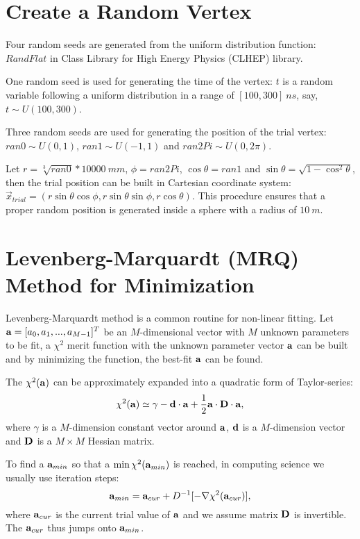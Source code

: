 \section{Create a Random Vertex}

Four random seeds are generated from the uniform distribution function: $RandFlat$ in Class Library for High Energy Physics (CLHEP) library.

One random seed is used for generating the time of the vertex: $t$ is a random variable following a uniform distribution in a range of $[100, 300]~ns$, say, $t\sim U(100,300)$.

Three random seeds are used for generating the position of the trial vertex: $ran0\sim U(0,1)$, $ran1\sim U(-1,1)$ and $ran2Pi\sim U(0,2\pi)$. 

Let $r=\sqrt[3]{ran0}*10000~mm$, $\phi=ran2Pi$, $\cos\theta=ran1$ and $\sin\theta=\sqrt{1-{\cos^2\theta}}$, then the trial position can be built in Cartesian coordinate system: $\vec{x}_{trial}=(r\sin\theta\cos\phi, r\sin\theta\sin\phi, r\cos\theta)$. This procedure ensures that a proper random position is generated inside a sphere with a radius of $10~m$.

\section{Levenberg-Marquardt (MRQ) Method for Minimization\cite{press2007numerical}}

Levenberg-Marquardt method is a common routine for non-linear fitting. Let ${\bf a} = [a_0, a_1, ..., a_{M-1}]^T$ be an $M$-dimensional vector with $M$ unknown parameters to be fit, a $\chi^2$ merit function with the unknown parameter vector $\bf a$ can be built and by minimizing the function, the best-fit $\bf a$ can be found.

The $\chi^2(\bf a)$ can be approximately expanded into a quadratic form of Taylor-series:
\begin{equation} \label{eq:1}
\chi^2({\bf a})\simeq \gamma-{\bf d\cdot a}+\frac{1}{2}{\bf a\cdot D\cdot a},
\end{equation}
where $\gamma$ is a $M$-dimension constant vector around $\bf a$, $\bf d$ is a $M$-dimension vector and $\bf D$ is a $M\times M$ Hessian matrix.

To find a ${\bf a}_{min}$ so that a $\min\chi^2({\bf a}_{min})$ is reached, in computing science we usually use iteration steps: 
\begin{equation} \label{eq:2}{\bf a}_{min}={\bf a}_{cur}+D^{-1}[-\nabla\chi^2({\bf a}_{cur})],\end{equation} 
where ${\bf a}_{cur}$ is the current trial value of $\bf a$ and we assume matrix $\bf D$ is invertible. The ${\bf a}_{cur}$ thus jumps onto ${\bf a}_{min}$. 


